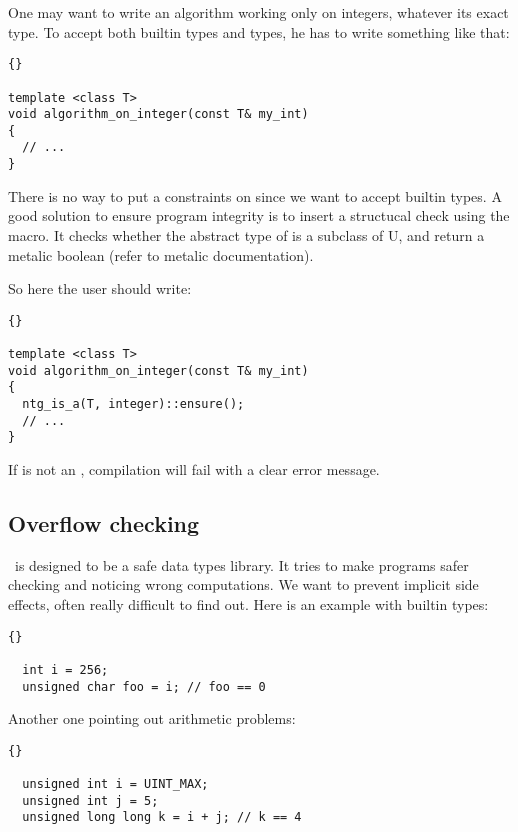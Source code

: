 One may want to write an algorithm working only on integers, whatever
its exact type. To accept both builtin types and {\integre} types, he
has to write something like that:

\begin{lstlisting}{}

template <class T>
void algorithm_on_integer(const T& my_int)
{
  // ...
}

\end{lstlisting}

There is no way to put a constraints on  since we want to
accept builtin types. A good solution to ensure program integrity is
to insert a structucal check using the  macro. It
checks whether the abstract type of  is a subclass of U, and
return a metalic boolean (refer to metalic documentation).

So here the user should write:

\begin{lstlisting}{}

template <class T>
void algorithm_on_integer(const T& my_int)
{
  ntg_is_a(T, integer)::ensure();
  // ...
}

\end{lstlisting}

If  is not an , compilation
will fail with a clear error message.

\subsection{Overflow checking}

\integre\ is designed to be a safe data types library. It tries to
make programs safer checking and noticing wrong computations. We want
to prevent implicit side effects, often really difficult to find
out. Here is an example with builtin types:

\begin{lstlisting}{}

  int i = 256;
  unsigned char foo = i; // foo == 0

\end{lstlisting}

Another one pointing out arithmetic problems:

\begin{lstlisting}{}

  unsigned int i = UINT_MAX;
  unsigned int j = 5;
  unsigned long long k = i + j; // k == 4

\end{lstlisting}

